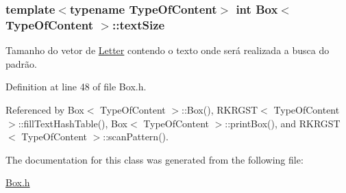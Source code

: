 \hypertarget{classBox_a2bfb2b656e74bc0f87f8acda76afbc86}{
\subsubsection[{text\+Size}]{\setlength{\rightskip}{0pt plus 5cm}template$<$typename Type\+Of\+Content$>$ int {\bf Box}$<$ Type\+Of\+Content $>$\+::text\+Size}}\label{classBox_a2bfb2b656e74bc0f87f8acda76afbc86}


Tamanho do vetor de \hyperlink{classLetter}{Letter} contendo o texto onde será realizada a busca do padrão. 



Definition at line 48 of file Box.\+h.



Referenced by Box$<$ Type\+Of\+Content $>$\+::\+Box(), R\+K\+R\+G\+S\+T$<$ Type\+Of\+Content $>$\+::fill\+Text\+Hash\+Table(), Box$<$ Type\+Of\+Content $>$\+::print\+Box(), and R\+K\+R\+G\+S\+T$<$ Type\+Of\+Content $>$\+::scan\+Pattern().



The documentation for this class was generated from the following file\+:\begin{DoxyCompactItemize}
\item 
\hyperlink{Box_8h}{Box.\+h}\end{DoxyCompactItemize}
